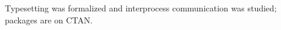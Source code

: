 \documentclass[11pt]{turabian-researchpaper}\usepackage[paperwidth=14cm,paperheight=15cm,margin=1cm]{geometry}\pagestyle{empty}
\begin{document}
Typesetting was formalized\autocite{knuth1984} and interprocess communication was studied\autocite{lamport1986}; packages are on CTAN\autocite{ctan}.
\printbibliography[heading=none]
\end{document}
